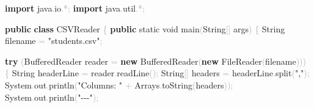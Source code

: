 \documentclass[
  justified,
  openright,
]{tufte-book}
\newcommand{\KeywordTok}[1]{\textcolor{CodeKeyword}{\textbf{#1}}}  %
\newcommand{\StringTok}[1]{\textcolor{CodeString}{#1}}              %
\newcommand{\CodeFuncTok}[1]{\textcolor{CodeKeyword}{#1}}           %
\newcommand{\CodeTypeTok}[1]{\textcolor{CodeType}{#1}}              %
\newcommand{\CodeAccentTok}[1]{\textcolor{CodeAccent}{#1}}          %
\newcommand{\OperatorTok}[1]{\textcolor{DarkGray}{#1}}              %
\newenvironment{Shaded}{%
  \begin{mdframed}[style=TufteCode]%
}{%
  \end{mdframed}%
}
\begin{document}
\begin{Shaded}
\begin{Highlighting}[]
\KeywordTok{import} \CodeAccentTok{java}\OperatorTok{.}\CodeAccentTok{io}\OperatorTok{.*;}
\KeywordTok{import} \CodeAccentTok{java}\OperatorTok{.}\CodeAccentTok{util}\OperatorTok{.*;}
 
\KeywordTok{public} \KeywordTok{class} CSVReader \OperatorTok{\{}
    \KeywordTok{public} \CodeTypeTok{static} \CodeTypeTok{void} \CodeFuncTok{main}\OperatorTok{(}String\OperatorTok{[]} args\OperatorTok{)} \OperatorTok{\{}
        String filename \OperatorTok{=} \StringTok{"students.csv"}\OperatorTok{;}
 
        \KeywordTok{try} \OperatorTok{(}BufferedReader reader \OperatorTok{=} \KeywordTok{new} BufferedReader\OperatorTok{(}\KeywordTok{new} FileReader\OperatorTok{(}filename\OperatorTok{)))} \OperatorTok{\{}
            String headerLine \OperatorTok{=} reader\OperatorTok{.}\CodeFuncTok{readLine}\OperatorTok{();}
            String\OperatorTok{[]} headers \OperatorTok{=} headerLine\OperatorTok{.}\CodeFuncTok{split}\OperatorTok{(}\StringTok{","}\OperatorTok{);}
            System\OperatorTok{.}\CodeFuncTok{out}\OperatorTok{.}\CodeFuncTok{println}\OperatorTok{(}\StringTok{"Columns: "} \OperatorTok{+} Arrays\OperatorTok{.}\CodeFuncTok{toString}\OperatorTok{(}headers\OperatorTok{));}
            System\OperatorTok{.}\CodeFuncTok{out}\OperatorTok{.}\CodeFuncTok{println}\OperatorTok{(}\StringTok{"{-}{-}{-}"}\OperatorTok{);}
 

\end{Highlighting}
\end{Shaded}
\end{document}
